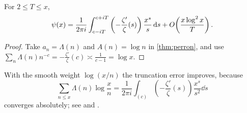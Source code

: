 \begin{corollary}\label{cor:psi}
For $2\le T\le x$,
\begin{equation}\label{eq:psi-perron}
\psi(x)=\frac{1}{2\pi i}\int_{c-iT}^{c+iT}\left(-\frac{\zeta'}{\zeta}(s)\right)\frac{x^{s}}{s}\,\mathrm{d} s + O\!\left(\frac{x\log^{2}x}{T}\right).
\end{equation}
\end{corollary}

\begin{proof}
Take $a_n=\Lambda(n)$ and $A(n)=\log n$ in \cref{thm:perron}, and use
$\sum_n\Lambda(n)n^{-c}=-\frac{\zeta'}{\zeta}(c)\asymp\frac{1}{c-1}=\log x$.
\end{proof}

\begin{remark}\label{rem:smooth}
With the smooth weight $\log(x/n)$ the truncation error improves, because
\begin{equation*}
\sum_{n\le x}\Lambda(n)\log\frac{x}{n} = \frac{1}{2\pi i}\int_{(c)}\left(-\frac{\zeta'}{\zeta}(s)\right)\frac{x^{s}}{s^{2}}\dd s
\end{equation*}
converges absolutely; see \cite[\S 17]{Davenport} and \cite[Thm.~3.12]{Titchmarsh}.
\end{remark}
